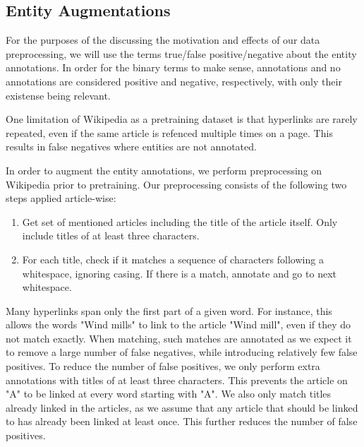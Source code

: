 \documentclass[main.tex]{subfiles}
\begin{document}
\subsection{Entity Augmentations}
\label{subsec:entaug}
For the purposes of the discussing the motivation and effects of our data preprocessing, we will use the terms true/false positive/negative about the entity annotations.
In order for the binary terms to make sense, annotations and no annotations are considered positive and negative, respectively, with only their existense being relevant.

One limitation of Wikipedia as a pretraining dataset is that hyperlinks are rarely repeated, even if the same article is refenced multiple times on a page.
This results in false negatives where entities are not annotated.

In order to augment the entity annotations, we perform preprocessing on Wikipedia prior to pretraining.
Our preprocessing consists of the following two steps applied article-wise:
\begin{enumerate}
    \item Get set of mentioned articles including the title of the article itself.
    Only include titles of at least three characters.
    \item For each title, check if it matches a sequence of characters following a whitespace, ignoring casing.
    If there is a match, annotate and go to next whitespace.
\end{enumerate}
Many hyperlinks span only the first part of a given word.
For instance, this allows the words "Wind mills" to link to the article "Wind mill", even if they do not match exactly.
When matching, such matches are annotated as we expect it to remove a large number of false negatives, while introducing relatively few false positives.
To reduce the number of false positives, we only perform extra annotations with titles of at least three characters.
This prevents the article on "A" to be linked at every word starting with "A".
We also only match titles already linked in the articles, as we assume that any article that should be linked to has already been linked at least once.
This further reduces the number of false positives.
\end{document}
